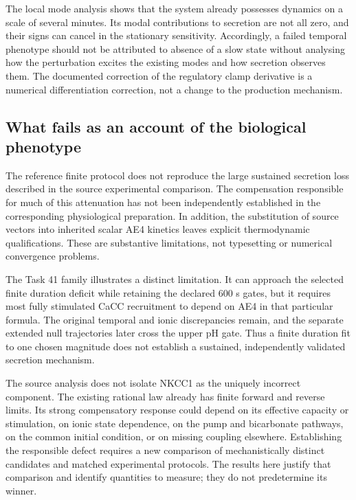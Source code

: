The local mode analysis shows that the system already possesses dynamics on a scale of several minutes. Its modal contributions to secretion are not all zero, and their signs can cancel in the stationary sensitivity. Accordingly, a failed temporal phenotype should not be attributed to absence of a slow state without analysing how the perturbation excites the existing modes and how secretion observes them. The documented correction of the regulatory clamp derivative is a numerical differentiation correction, not a change to the production mechanism.

\subsection{What fails as an account of the biological phenotype}
The reference finite protocol does not reproduce the large sustained secretion loss described in the source experimental comparison. The compensation responsible for much of this attenuation has not been independently established in the corresponding physiological preparation. In addition, the substitution of source vectors into inherited scalar AE4 kinetics leaves explicit thermodynamic qualifications. These are substantive limitations, not typesetting or numerical convergence problems.

The Task 41 family illustrates a distinct limitation. It can approach the selected finite duration deficit while retaining the declared 600 s gates, but it requires most fully stimulated CaCC recruitment to depend on AE4 in that particular formula. The original temporal and ionic discrepancies remain, and the separate extended null trajectories later cross the upper pH gate. Thus a finite duration fit to one chosen magnitude does not establish a sustained, independently validated secretion mechanism.

The source analysis does not isolate NKCC1 as the uniquely incorrect component. The existing rational law already has finite forward and reverse limits. Its strong compensatory response could depend on its effective capacity or stimulation, on ionic state dependence, on the pump and bicarbonate pathways, on the common initial condition, or on missing coupling elsewhere. Establishing the responsible defect requires a new comparison of mechanistically distinct candidates and matched experimental protocols. The results here justify that comparison and identify quantities to measure; they do not predetermine its winner.

